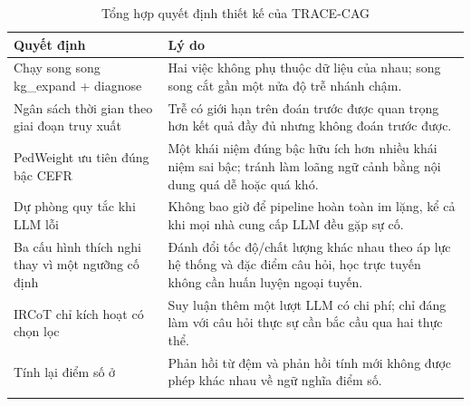 \begin{longtable}{L{4.0cm} L{9.6cm}}
\toprule
\textbf{Quyết định} & \textbf{Lý do}\\
\midrule
\endhead
Chạy song song kg\_expand + diagnose & Hai việc không phụ thuộc dữ liệu của nhau; song song cắt gần một nửa độ trễ nhánh chậm.\\
Ngân sách thời gian theo giai đoạn truy xuất & Trễ có giới hạn trên đoán trước được quan trọng hơn kết quả đầy đủ nhưng không đoán trước được.\\
PedWeight ưu tiên đúng bậc CEFR & Một khái niệm đúng bậc hữu ích hơn nhiều khái niệm sai bậc; tránh làm loãng ngữ cảnh bằng nội dung quá dễ hoặc quá khó.\\
Dự phòng quy tắc khi LLM lỗi & Không bao giờ để pipeline hoàn toàn im lặng, kể cả khi mọi nhà cung cấp LLM đều gặp sự cố.\\
Ba cấu hình thích nghi thay vì một ngưỡng cố định & Đánh đổi tốc độ/chất lượng khác nhau theo áp lực hệ thống và đặc điểm câu hỏi, học trực tuyến không cần huấn luyện ngoại tuyến.\\
IRCoT chỉ kích hoạt có chọn lọc & Suy luận thêm một lượt LLM có chi phí; chỉ đáng làm với câu hỏi thực sự cần bắc cầu qua hai thực thể.\\
Tính lại điểm số ở  & Phản hồi từ đệm và phản hồi tính mới không được phép khác nhau về ngữ nghĩa điểm số.\\
\bottomrule
\caption{Tổng hợp quyết định thiết kế của TRACE-CAG}
\end{longtable}
